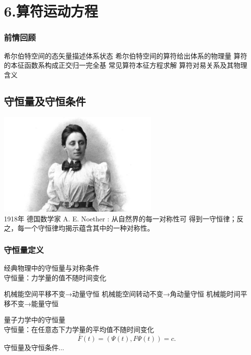 \section{6.算符运动方程}

\begin{frame}
    \frametitle{前情回顾}
    \begin{itemize}
        \Item 希尔伯特空间的态矢量描述体系状态
        \Item 希尔伯特空间的算符给出体系的物理量
        \Item 算符的本征函数系构成正交归一完全基
        \Item 常见算符本征方程求解
        \Item 算符对易关系及其物理含义 
    \end{itemize}   
\end{frame} 

\subsection{守恒量及守恒条件}

\begin{frame}
\includegraphics[width=0.6\textwidth]{figs/2021-12-17-21-25-13.png} \\
1918年 德国数学家 A. E. Noether : 从自然界的每一对称性可
得到一守恒律；反之，每一个守恒律均揭示蕴含其中的一种对称性。
\end{frame} 

\begin{frame} 
    \frametitle{守恒量定义}
    \begin{enumerate}
        \Item  经典物理中的守恒量与对称条件\\
                守恒量：力学量的值不随时间变化\\
                \begin{itemize}
                    \Item 机械能空间平移不变→动量守恒
                    \Item 机械能空间转动不变→角动量守恒
                    \Item 机械能时间平移不变→能量守恒
                \end{itemize}
        \Item  量子力学中的守恒量\\
                守恒量：在任意态下力学量的平均值不随时间变化\\
                $$ \bar{F}(t)=(\Psi(t), F\Psi(t)) =c.  $$
                守恒量及守恒条件... 
    \end{enumerate}
\end{frame} 

